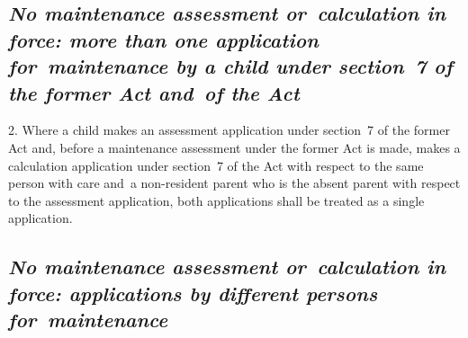\documentclass[12pt,a4paper]{article}
\begin{document}
%
%


\subsection*{\itshape No maintenance assessment or~calculation in force: more than one application for~maintenance by a child under section~7 of the former Act and~of the Act}

2.  Where a child makes an assessment application under section~7 of the former Act and, before a maintenance assessment under the former Act is made, makes a calculation application under section~7 of the Act with respect to the same person with care and~a non-resident parent who is the absent parent with respect to the assessment application, both applications shall be treated as a single application.

\subsection*{\itshape No maintenance assessment or~calculation in force: applications by different persons for~maintenance}
\end{document}
